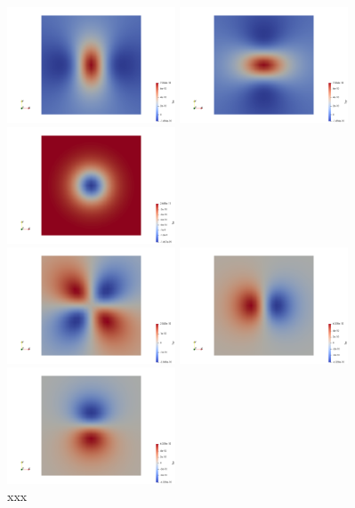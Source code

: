 \begin{center}
\includegraphics[width=5cm]{python_codes/fieldstone_84/cube/Txx}
\includegraphics[width=5cm]{python_codes/fieldstone_84/cube/Tyy}
\includegraphics[width=5cm]{python_codes/fieldstone_84/cube/Tzz}\\
\includegraphics[width=5cm]{python_codes/fieldstone_84/cube/Txy}
\includegraphics[width=5cm]{python_codes/fieldstone_84/cube/Txz}
\includegraphics[width=5cm]{python_codes/fieldstone_84/cube/Tyz}\\
{\captionfont  xxx}
\end{center}

